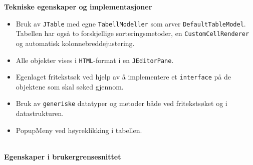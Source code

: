 \textbf{Tekniske egenskaper og implementasjoner}

\begin{itemize}[noitemsep,nolistsep]
\item Bruk av \texttt{JTable} med egne \texttt{TabellModeller} som arver \texttt{DefaultTableModel}. Tabellen har også to forskjellige sorteringsmetoder, en \texttt{CustomCellRenderer} og automatisk kolonnebreddejustering. \\
\item Alle objekter vises i \texttt{HTML}-format i en \texttt{JEditorPane}. \\
\item Egenlaget fritekstsøk ved hjelp av å implementere et \texttt{interface} på de objektene som skal søked gjennom. \\
\item Bruk av \texttt{generiske} datatyper og metoder både ved fritekstsøket og i datastrukturen.
\item PopupMeny ved høyreklikking i tabellen. \\\\
\end{itemize}


\textbf{Egenskaper i brukergrensesnittet} \\

